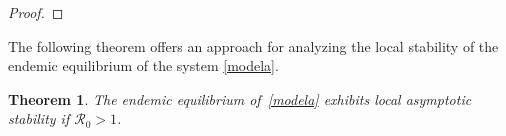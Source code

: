 \documentclass[preprint]{elsarticle}
\newtheorem{theorem}{Theorem}
\begin{document}
\begin{proof}
%
%
\end{proof}

The following theorem offers an approach for analyzing the local stability of the endemic equilibrium of the system \ref{modela}.

\begin{theorem}
The endemic equilibrium of~\eqref{modela} exhibits local asymptotic stability if $\mathcal{R}_0>1$.
\end{theorem}
\end{document}
